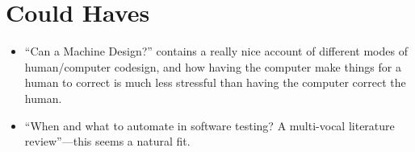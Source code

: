 \section{Could Haves}

\begin{itemize}
\item ``Can a Machine Design?''\cite{doi:10.1162/07479360152681083} contains a really nice account of different modes of human/computer codesign,
and how having the computer make things for a human to correct is much less stressful than having the computer correct the human.
\item ``When and what to automate in software testing? {A} multi-vocal literature review''\cite{DBLP:journals/infsof/GarousiM16}---this
seems a natural fit.
\end{itemize}




